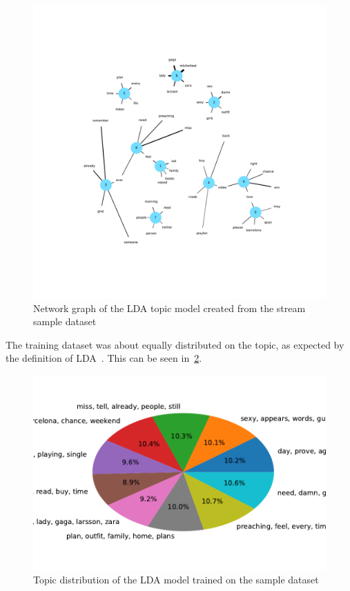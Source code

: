 \begin{figure}
    \centering
    \caption{Network graph of the LDA topic model created from the stream sample dataset}
    \label{fig:lda_network_graph}
    \includegraphics[width=\textwidth]{../figures/lda_network_graph.pdf}
\end{figure}

The training dataset was about equally distributed on the topic, as expected by the definition of LDA~\cite{Blei2003}.
This can be seen in~\ref{fig:sample_topic_distribution}.

\begin{figure}
    \centering
    \caption{Topic distribution of the LDA model trained on the sample dataset}
    \label{fig:sample_topic_distribution}
    \includegraphics[width=\textwidth]{../figures/topic_distribution.pdf}
\end{figure}

